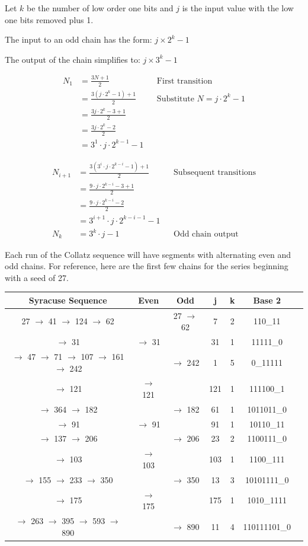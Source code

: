 \documentclass[letterpaper]{article}
\begin{document}
Let \( k \) be the number of low order one bits and \( j \) is the input value with the low one bits removed plus 1.

The input to an odd chain has the form: \( j \times 2^k - 1 \)

The output of the chain simplifies to: \( j \times 3^k - 1 \)

\begin{align*}
    N_1 &= \frac{3N + 1}{2} & &\text{First transition} \\
        &= \frac{3(j \cdot 2^k - 1) + 1}{2} & &\text{Substitute } N = j \cdot 2^k - 1 \\
        &= \frac{3j \cdot 2^k - 3 + 1}{2} \\
        &= \frac{3j \cdot 2^k - 2}{2} \\
        &= 3^1 \cdot j \cdot 2^{k-1} - 1
\end{align*}

\begin{align*}
    N_{i+1} &= \frac{3 \left(3^i \cdot j \cdot 2^{k-i} - 1\right) + 1}{2} & &\text{Subsequent transitions} \\
            &= \frac{9 \cdot j \cdot 2^{k-i} - 3 + 1}{2} \\
            &= \frac{9 \cdot j \cdot 2^{k-i} - 2}{2} \\
            &= 3^{i+1} \cdot j \cdot 2^{k-i-1} - 1 \\
    N_k     &= 3^k \cdot j - 1 & &\text{Odd chain output}
\end{align*}

Each run of the Collatz sequence will have segments with alternating even and odd chains. For reference, here are the first few chains for the series beginning with a seed of 27.

\begin{center}
\begin{tabular}{|c|c|c|c|c|c|c|}
\hline
\textbf{Syracuse Sequence} & \textbf{Even} & \textbf{Odd} & \textbf{j} & \textbf{k} & \textbf{Base 2} \\ 
\hline
27 $\to$ 41 $\to$ 124 $\to$ 62&&27 $\to$ 62&7&2&110\_11 \\ 
\hline
$\to$ 31&$\to$ 31&&31&1&11111\_0 \\ 
\hline
$\to$ 47 $\to$ 71 $\to$ 107 $\to$ 161 $\to$ 242&&$\to$ 242&1&5&0\_11111 \\ 
\hline
$\to$ 121&$\to$ 121&&121&1&111100\_1 \\ 
\hline
$\to$ 364 $\to$ 182&&$\to$ 182&61&1&1011011\_0 \\ 
\hline
$\to$ 91&$\to$ 91&&91&1&10110\_11 \\ 
\hline
$\to$ 137 $\to$ 206&&$\to$ 206&23&2&1100111\_0 \\ 
\hline
$\to$ 103&$\to$ 103&&103&1&1100\_111 \\ 
\hline
$\to$ 155 $\to$ 233 $\to$ 350&&$\to$ 350&13&3&10101111\_0 \\ 
\hline
$\to$ 175&$\to$ 175&&175&1&1010\_1111 \\ 
\hline
$\to$ 263 $\to$ 395 $\to$ 593 $\to$ 890&&$\to$ 890&11&4&110111101\_0 \\ 
\hline
\end{tabular}
\end{center}
\end{document}
